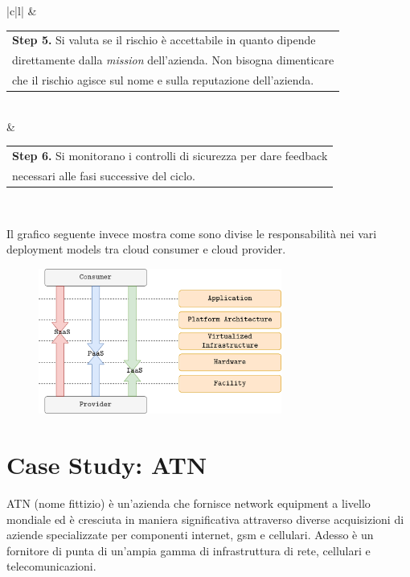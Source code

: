 \begin{table}[htb!]
\begin{tabular}{|c|l|}
\hline
{}    & \begin{tabular}[c]{@{}l@{}}\textbf{Step 5. }Si valuta se il rischio è accettabile in quanto dipende \\direttamente dalla \textit{mission }dell'azienda. Non bisogna dimenticare \\che il rischio agisce sul nome e sulla reputazione dell'azienda.\end{tabular}  \\ 
                                                                          & \begin{tabular}[c]{@{}l@{}}\textbf{Step 6. }Si monitorano i controlli di sicurezza per dare feedback \\necessari alle fasi successive del ciclo.\end{tabular}                                                                                                    \\
\hline
\end{tabular}
\end{table}

Il grafico seguente invece mostra come sono divise le responsabilità nei vari deployment models tra cloud consumer e cloud provider.

\begin{figure}[htb!]
    \centering
    \includegraphics[width=8cm]{./Images/cap7/7.4.png}
\end{figure}

\section{Case Study: ATN}
ATN (nome fittizio) è un'azienda che fornisce network equipment a livello mondiale ed è cresciuta in maniera significativa attraverso diverse acquisizioni di aziende specializzate per componenti internet, gsm e cellulari. Adesso è un fornitore di punta di un'ampia gamma di infrastruttura di rete, cellulari e telecomunicazioni. 

